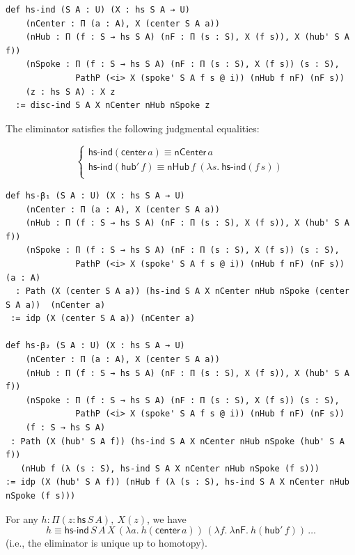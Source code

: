 \documentclass{article}
\begin{document}
\begin{lstlisting}[mathescape=true]
def hs-ind (S A : U) (X : hs S A → U)
    (nCenter : Π (a : A), X (center S A a))
    (nHub : Π (f : S → hs S A) (nF : Π (s : S), X (f s)), X (hub' S A f))
    (nSpoke : Π (f : S → hs S A) (nF : Π (s : S), X (f s)) (s : S),
              PathP (<i> X (spoke' S A f s @ i)) (nHub f nF) (nF s))
    (z : hs S A) : X z
  := disc-ind S A X nCenter nHub nSpoke z
\end{lstlisting}

\begin{theorem}
The eliminator satisfies the following judgmental equalities:

\[
\begin{cases}
\mathsf{hs\text{-}ind}(\mathsf{center}\, a) \equiv \mathsf{nCenter}\, a \\
\mathsf{hs\text{-}ind}(\mathsf{hub}'\, f) \equiv \mathsf{nHub}\, f\ (\lambda s.\ \mathsf{hs\text{-}ind}(f\, s)) \\
\end{cases}
\]

\end{theorem}

\begin{lstlisting}[mathescape=true]
def hs-β₁ (S A : U) (X : hs S A → U)
    (nCenter : Π (a : A), X (center S A a))
    (nHub : Π (f : S → hs S A) (nF : Π (s : S), X (f s)), X (hub' S A f))
    (nSpoke : Π (f : S → hs S A) (nF : Π (s : S), X (f s)) (s : S),
              PathP (<i> X (spoke' S A f s @ i)) (nHub f nF) (nF s)) (a : A)
  : Path (X (center S A a)) (hs-ind S A X nCenter nHub nSpoke (center S A a))  (nCenter a)
 := idp (X (center S A a)) (nCenter a)

def hs-β₂ (S A : U) (X : hs S A → U)
    (nCenter : Π (a : A), X (center S A a))
    (nHub : Π (f : S → hs S A) (nF : Π (s : S), X (f s)), X (hub' S A f))
    (nSpoke : Π (f : S → hs S A) (nF : Π (s : S), X (f s)) (s : S),
              PathP (<i> X (spoke' S A f s @ i)) (nHub f nF) (nF s))
    (f : S → hs S A)
 : Path (X (hub' S A f)) (hs-ind S A X nCenter nHub nSpoke (hub' S A f)) 
   (nHub f (λ (s : S), hs-ind S A X nCenter nHub nSpoke (f s)))
:= idp (X (hub' S A f)) (nHub f (λ (s : S), hs-ind S A X nCenter nHub nSpoke (f s)))
\end{lstlisting}

\begin{theorem}[Uniqueness]
For any \(h : \Pi (z : \mathsf{hs}\, S\, A),\ X(z)\), we have
\[
h \equiv \mathsf{hs\text{-}ind}\, S\, A\, X\, (\lambda a.\ h(\mathsf{center}\, a))\, 
(\lambda f.\ \lambda \mathsf{nF}.\ h(\mathsf{hub}'\, f))\, \dots
\]
(i.e., the eliminator is unique up to homotopy).
\end{theorem}
\end{document}
